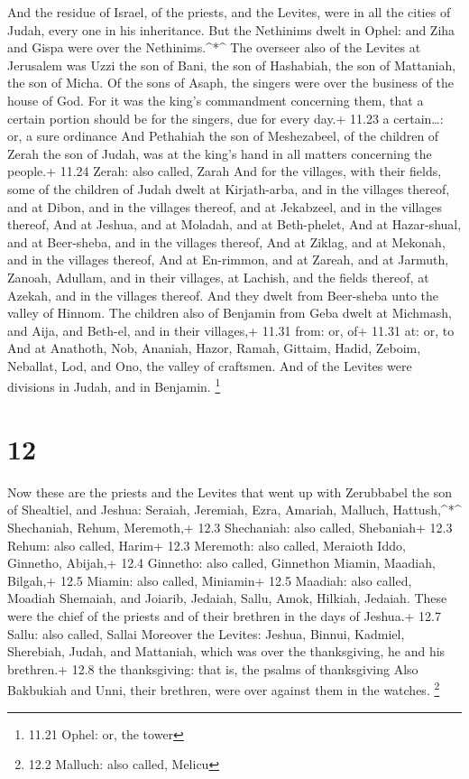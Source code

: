  And the residue of Israel, of the priests, and the
Levites, were in all the cities of Judah, every one in his inheritance.
 But the Nethinims dwelt in Ophel: and Ziha and Gispa were
over the Nethinims.\^{}*\^{}  The overseer also of the
Levites at Jerusalem was Uzzi the son of Bani, the son of Hashabiah, the
son of Mattaniah, the son of Micha. Of the sons of Asaph, the singers
were over the business of the house of God.  For it was the
king's commandment concerning them, that a certain portion should be for
the singers, due for every day.+ 11.23 a certain\ldots: or, a sure
ordinance  And Pethahiah the son of Meshezabeel, of the
children of Zerah the son of Judah, was at the king's hand in all
matters concerning the people.+ 11.24 Zerah: also called, Zarah
 And for the villages, with their fields, some of the
children of Judah dwelt at Kirjath-arba, and in the villages thereof,
and at Dibon, and in the villages thereof, and at Jekabzeel, and in the
villages thereof,  And at Jeshua, and at Moladah, and at
Beth-phelet,  And at Hazar-shual, and at Beer-sheba, and in
the villages thereof,  And at Ziklag, and at Mekonah, and
in the villages thereof,  And at En-rimmon, and at Zareah,
and at Jarmuth,  Zanoah, Adullam, and in their villages, at
Lachish, and the fields thereof, at Azekah, and in the villages thereof.
And they dwelt from Beer-sheba unto the valley of Hinnom. 
The children also of Benjamin from Geba dwelt at Michmash, and Aija, and
Beth-el, and in their villages,+ 11.31 from: or, of+ 11.31 at: or, to
 And at Anathoth, Nob, Ananiah,  Hazor, Ramah,
Gittaim,  Hadid, Zeboim, Neballat,  Lod, and
Ono, the valley of craftsmen.  And of the Levites were
divisions in Judah, and in Benjamin. \footnote{11.21 Ophel: or, the
  tower}

\hypertarget{section-11}{%
\section{12}\label{section-11}}

 Now these are the priests and the Levites that went up with
Zerubbabel the son of Shealtiel, and Jeshua: Seraiah, Jeremiah, Ezra,
 Amariah, Malluch, Hattush,\^{}*\^{} 
Shechaniah, Rehum, Meremoth,+ 12.3 Shechaniah: also called, Shebaniah+
12.3 Rehum: also called, Harim+ 12.3 Meremoth: also called, Meraioth
 Iddo, Ginnetho, Abijah,+ 12.4 Ginnetho: also called,
Ginnethon  Miamin, Maadiah, Bilgah,+ 12.5 Miamin: also
called, Miniamin+ 12.5 Maadiah: also called, Moadiah 
Shemaiah, and Joiarib, Jedaiah,  Sallu, Amok, Hilkiah,
Jedaiah. These were the chief of the priests and of their brethren in
the days of Jeshua.+ 12.7 Sallu: also called, Sallai 
Moreover the Levites: Jeshua, Binnui, Kadmiel, Sherebiah, Judah, and
Mattaniah, which was over the thanksgiving, he and his brethren.+ 12.8
the thanksgiving: that is, the psalms of thanksgiving  Also
Bakbukiah and Unni, their brethren, were over against them in the
watches. \footnote{12.2 Malluch: also called, Melicu}

